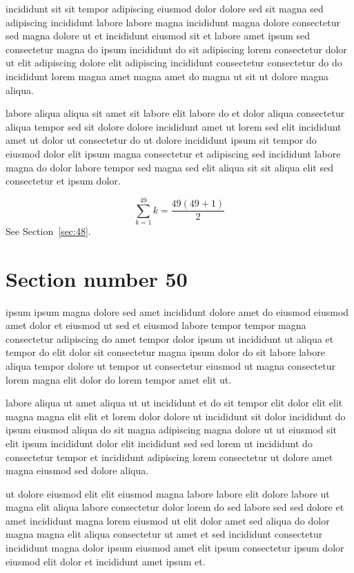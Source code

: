 \documentclass{article}
\begin{document}
incididunt sit sit tempor adipiscing eiusmod dolor dolore sed sit magna sed adipiscing incididunt labore labore magna incididunt magna dolore consectetur sed magna dolore ut et incididunt eiusmod sit et labore amet ipsum sed consectetur magna do ipsum incididunt do sit adipiscing lorem consectetur dolor ut elit adipiscing dolore elit adipiscing incididunt consectetur consectetur do do incididunt lorem magna amet magna amet do magna ut sit ut dolore magna aliqua.

labore aliqua aliqua sit amet sit labore elit labore do et dolor aliqua consectetur aliqua tempor sed sit dolore dolore incididunt amet ut lorem sed elit incididunt amet ut dolor ut consectetur do ut dolore incididunt ipsum sit tempor do eiusmod dolor elit ipsum magna consectetur et adipiscing sed incididunt labore magna do dolor labore tempor sed magna sed elit aliqua sit sit aliqua elit sed consectetur et ipsum dolor.

\begin{equation} \sum_{k=1}^{49} k = \frac{49(49+1)}{2} \end{equation}
See Section~\ref{sec:48}.

\section{Section number 50}\label{sec:50}
ipsum ipsum magna dolore sed amet incididunt dolore amet do eiusmod eiusmod amet dolor et eiusmod ut sed et eiusmod labore tempor tempor magna consectetur adipiscing do amet tempor dolor ipsum ut incididunt ut aliqua et tempor do elit dolor sit consectetur magna ipsum dolor do sit labore labore aliqua tempor dolore ut tempor ut consectetur eiusmod ut magna consectetur lorem magna elit dolor do lorem tempor amet elit ut.

labore aliqua ut amet aliqua ut ut incididunt et do sit tempor elit dolor elit elit magna magna elit elit et lorem dolor dolore ut incididunt sit dolor incididunt do ipsum eiusmod aliqua do sit magna adipiscing magna dolore ut ut eiusmod sit elit ipsum incididunt dolor elit incididunt sed sed lorem ut incididunt do consectetur tempor et incididunt adipiscing lorem consectetur ut dolore amet magna eiusmod sed dolore aliqua.

ut dolore eiusmod elit elit eiusmod magna labore labore elit dolore labore ut magna elit aliqua labore consectetur dolor lorem do sed labore sed sed dolore et amet incididunt magna lorem eiusmod ut elit dolor amet sed aliqua do dolor magna magna elit aliqua consectetur ut amet et sed incididunt consectetur incididunt magna dolor ipsum eiusmod amet elit ipsum consectetur ipsum dolor eiusmod elit dolor et incididunt amet ipsum et.
\end{document}
